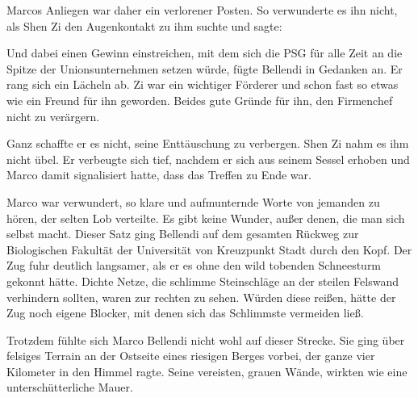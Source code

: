 Marcos Anliegen war daher ein verlorener Posten. So verwunderte es ihn nicht, als Shen Zi den Augenkontakt zu ihm suchte und sagte: 

\par

Und dabei einen Gewinn einstreichen, mit dem sich die PSG für alle Zeit an die Spitze der Unionsunternehmen setzen würde, fügte Bellendi in Gedanken an. Er rang sich ein Lächeln ab. Zi war ein wichtiger Förderer und schon fast so etwas wie ein Freund für ihn geworden. Beides gute Gründe für ihn, den Firmenchef nicht zu verärgern.

\par

 Ganz schaffte er es nicht, seine Enttäuschung zu verbergen. Shen Zi nahm es ihm nicht übel. Er verbeugte sich tief, nachdem er sich aus seinem Sessel erhoben und Marco damit signalisiert hatte, dass das Treffen zu Ende war.

\par

 Marco war verwundert, so klare und aufmunternde Worte von jemanden zu hören, der selten Lob verteilte. 
\ortswechsel
Es gibt keine Wunder, außer denen, die man sich selbst macht. Dieser Satz ging Bellendi auf dem gesamten Rückweg zur Biologischen Fakultät der Universität von Kreuzpunkt Stadt durch den Kopf. Der Zug fuhr deutlich langsamer, als er es ohne den wild tobenden Schneesturm gekonnt hätte. Dichte Netze, die schlimme Steinschläge an der steilen Felswand verhindern sollten, waren zur rechten zu sehen. Würden diese reißen, hätte der Zug noch eigene Blocker, mit denen sich das Schlimmste vermeiden ließ.

\par

Trotzdem fühlte sich Marco Bellendi nicht wohl auf dieser Strecke. Sie ging über felsiges Terrain an der Ostseite eines riesigen Berges vorbei, der ganze vier Kilometer in den Himmel ragte. Seine vereisten, grauen Wände, wirkten wie eine unterschütterliche Mauer.

